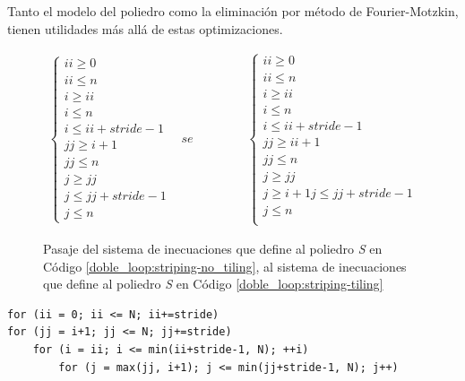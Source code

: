 \documentclass{article}
\begin{document}
Tanto el modelo del poliedro como la eliminación por método de Fourier-Motzkin, tienen utilidades más allá
de estas optimizaciones.

\begin{figure}
\begin{displaymath}
	\begin{array}{rrr}
		\left\{
			\begin{array}{r}
			ii\geq 0\\
			ii\leq n\\
			i\geq ii\\
			i\leq n\\
			i\leq ii+stride-1\\
			jj\geq i+1\\
			jj\leq n\\
			j\geq jj\\
			j\leq jj+stride-1\\
			j\leq n
			\end{array}
		\right.
		&
		\textit{se convierte en}
		&
		\left\{
			\begin{array}{r}
			ii\geq 0\\
			ii\leq n\\
			i\geq ii\\
			i\leq n\\
			i\leq ii+stride-1\\
			jj\geq ii+1\\
			jj\leq n\\
			j\geq jj\\
			j\geq i+1
			j\leq jj+stride-1\\
			j\leq n\\
			\end{array}
		\right.
	\end{array}
\end{displaymath}
	\caption{Pasaje del sistema de inecuaciones que define al poliedro \textit{S} en Código \ref{doble_loop:striping-no_tiling},
	al sistema de inecuaciones que define al poliedro \textit{S} en Código \ref{doble_loop:striping-tiling}}
	\label{fig:fourier_motzkin}
\end{figure}

\begin{lstlisting}[style=CStyle,label=doble_loop:striping-tiling,caption=doble loop con loop-tiling]
for (ii = 0; ii <= N; ii+=stride)
for (jj = i+1; jj <= N; jj+=stride)
	for (i = ii; i <= min(ii+stride-1, N); ++i)
		for (j = max(jj, i+1); j <= min(jj+stride-1, N); j++)
\end{lstlisting}
\end{document}

